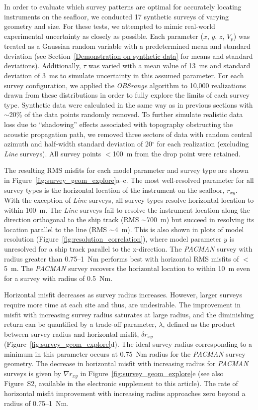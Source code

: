 In order to evaluate which survey patterns are optimal for accurately locating instruments on the seafloor, we conducted 17 synthetic surveys of varying geometry and size. For these tests, we attempted to mimic real-world experimental uncertainty as closely as possible. Each parameter ($x$, $y$, $z$, $V_p$) was treated as a Gaussian random variable with a predetermined mean and standard deviation (see Section~\ref{Demonstration on synthetic data} for means and standard deviations). Additionally, $\tau$ was varied with a mean value of 13~ms and standard deviation of 3~ms to simulate uncertainty in this assumed parameter. For each survey configuration, we applied the \textit{OBSrange} algorithm to 10,000 realizations drawn from these distributions in order to fully explore the limits of each survey type. Synthetic data were calculated in the same way as in previous sections with $\sim$20\% of the data points randomly removed. To further simulate realistic data loss due to ``shadowing'' effects associated with topography obstructing the acoustic propagation path, we removed three sectors of data with random central azimuth and half-width standard deviation of 20$^{\circ}$ for each realization (excluding \textit{Line} surveys). All survey points $<$100~m from the drop point were retained.

The resulting RMS misfits for each model parameter and survey type are shown in Figure~\ref{fig:survey_geom_explore}a--c. The most well-resolved parameter for all survey types is the horizontal location of the instrument on the seafloor, $r_{xy}$. With the exception of \textit{Line} surveys, all survey types resolve horizontal location to within 100~m. The \textit{Line} surveys fail to resolve the instrument location along the direction orthogonal to the ship track (RMS $\sim$700~m) but succeed in resolving its location parallel to the line (RMS $\sim$4~m). This is also shown in plots of model resolution (Figure~\ref{fig:resolution_correlation}), where model parameter $y$ is unresolved for a ship track parallel to the x-direction. The \textit{PACMAN} survey with radius greater than 0.75--1~Nm performs best with horizontal RMS misfits of $<$5~m. The \textit{PACMAN} survey recovers the horizontal location to within 10~m even for a survey with radius of 0.5~Nm.

Horizontal misfit decreases as survey radius increases. However, larger surveys require more time at each site and thus, are undesirable. The improvement in misfit with increasing survey radius saturates at large radius, and the diminishing return can be quantified by a trade-off parameter, $\lambda$, defined as the product between survey radius and horizontal misfit, $\delta r_{xy}$ (Figure~\ref{fig:survey_geom_explore}d). The ideal survey radius corresponding to a minimum in this parameter occurs at 0.75~Nm radius for the \textit{PACMAN} survey geometry. The decrease in horizontal misfit with increasing radius for \textit{PACMAN} surveys is given by $\nabla r_{xy}$ in Figure~\ref{fig:survey_geom_explore}e (see also Figure~S2, available in the electronic supplement to this article). The rate of horizontal misfit improvement with increasing radius approaches zero beyond a radius of 0.75--1~Nm.

